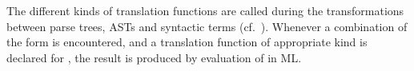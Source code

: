 \begin{isabellebody}
\begin{isamarkuptext}
\begin{description}
  \end{description}%
\end{isamarkuptext}%
\isamarkuptrue%
%
\isamarkuptrue%
%
\begin{isamarkuptext}%
The different kinds of translation functions are called during
  the transformations between parse trees, ASTs and syntactic terms
  (cf.\ ).  Whenever a combination of the form
   is encountered, and a translation function
   of appropriate kind is declared for , the
  result is produced by evaluation of  in ML.


\end{isamarkuptext}
\end{isabellebody}
